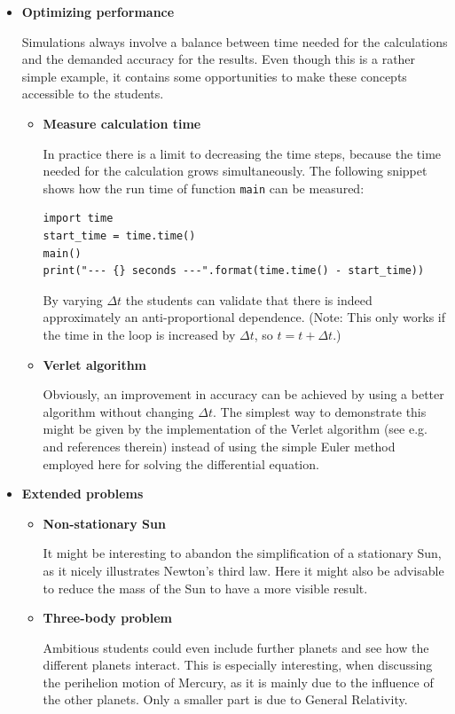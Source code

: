 \documentclass[12pt,ngerman,american]{iopart}
\begin{document}
\begin{itemize}
\item \textbf{Optimizing performance}

Simulations always involve a balance between time needed for the calculations and the demanded accuracy for the results.
Even though this is a rather simple example, it contains some opportunities to make these concepts accessible to the students.

\begin{itemize}
\item \textbf{Measure calculation time}

In practice there is a limit to decreasing the time steps, because the time needed for the calculation grows simultaneously.
The following snippet shows how the run time of function \texttt{main} can be measured:
\begin{lstlisting}
import time
start_time = time.time()
main()
print("--- {} seconds ---".format(time.time() - start_time))
\end{lstlisting}
By varying $\Delta t$ the students can validate that there is indeed approximately an anti-proportional dependence.
(Note: This only works if the time in the loop is increased by $\Delta t$, so $t=t+\Delta t$.)
\item \textbf{Verlet algorithm}

Obviously, an improvement in accuracy can be achieved by using a better algorithm without changing $\Delta t$.
The simplest way to demonstrate this might be given by the implementation of the Verlet algorithm (see e.g.~\cite{Hairer03geometricnumerical} and references therein) instead of using the simple Euler method employed here for solving the differential equation.
\end{itemize}

\item \textbf{Extended problems}

\begin{itemize}
\item \textbf{Non-stationary Sun}

It might be interesting to abandon the simplification of a stationary Sun, as it nicely illustrates Newton's third law.
Here it might also be advisable to reduce the mass of the Sun to have a more visible result.

\item \textbf{Three-body problem}

Ambitious students could even include further planets and see how the different planets interact.
This is especially interesting, when discussing the perihelion motion of Mercury, as it is mainly due to the influence of the other planets.
Only a smaller part is due to General Relativity.

\end{itemize}

\end{itemize}
\end{document}
